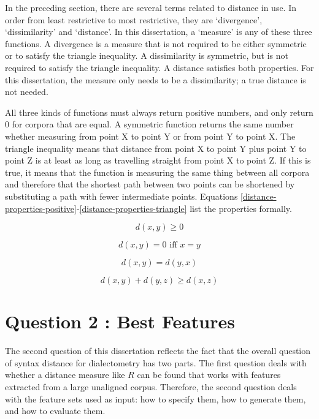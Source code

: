 In the preceding section, there are several terms related to distance
in use. In order from least restrictive to most restrictive, they are
`divergence', `dissimilarity' and `distance'. In this dissertation, a
`measure' is any of these three functions. A divergence is a measure
that is not required to be either symmetric or to satisfy the triangle
inequality. A dissimilarity is symmetric, but is not required to
satisfy the triangle inequality. A distance satisfies both
properties. For this dissertation, the measure only needs to be a
dissimilarity; a true distance is not needed.

All three kinds of functions must always return positive numbers, and
only return 0 for corpora that are equal.  A symmetric function
returns the same number whether measuring from point X to point Y or
from point Y to point X. The triangle inequality means that distance
from point X to point Y plus point Y to point Z is at least as long as
travelling straight from point X to point Z.  If this is true, it
means that the function is measuring the same thing between all
corpora and therefore that the shortest path between two points can be
shortened by substituting a path with fewer intermediate
points. Equations
\ref{distance-properties-positive}-\ref{distance-properties-triangle}
list the properties formally.

\begin{equation}
  d(x,y) \ge 0
  \label{distance-properties-positive}
\end{equation}

\begin{equation}
 d(x,y) = 0 \textrm{ iff } x=y
\end{equation}

\begin{equation}
  d(x,y) = d(y,x)
\end{equation}

\begin{equation}
  d(x,y) + d(y,z) \ge d(x,z)
\label{distance-properties-triangle}
\end{equation}

\section{Question 2 : Best Features}

The second question of this dissertation reflects the fact that the
overall question of syntax distance for dialectometry has two
parts. The first question deals with whether a distance measure like
$R$ can be found that works with features extracted from a
large unaligned corpus. Therefore, the second question deals with the
feature sets used as input: how to specify them, how to generate them,
and how to evaluate them.

